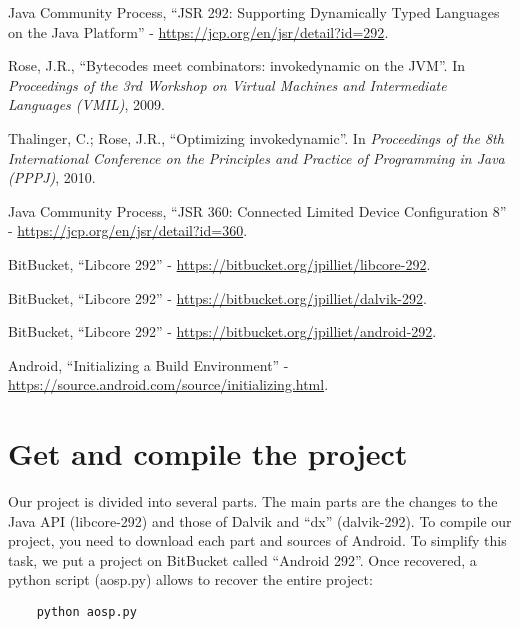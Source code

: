 \documentclass{sig-alternate}
\begin{document}
\begin{thebibliography}{}
  Java Community Process, ``JSR 292: Supporting Dynamically Typed Languages on the Java{\scriptsize\texttrademark} Platform'' - \url{https://jcp.org/en/jsr/detail?id=292}.

  Rose, J.R., ``Bytecodes meet combinators: invokedynamic on the JVM''. In {\it Proceedings of the 3rd Workshop on Virtual Machines and Intermediate Languages (VMIL)}, 2009.

  Thalinger, C.; Rose, J.R., ``Optimizing invokedynamic''. In {\it Proceedings of the 8th International Conference on the Principles and Practice of Programming in Java (PPPJ)}, 2010.

  Java Community Process, ``JSR 360: Connected Limited Device Configuration 8'' - \url{https://jcp.org/en/jsr/detail?id=360}.

  BitBucket, ``Libcore 292'' - \url{https://bitbucket.org/jpilliet/libcore-292}.

  BitBucket, ``Libcore 292'' - \url{https://bitbucket.org/jpilliet/dalvik-292}.

  BitBucket, ``Libcore 292'' - \url{https://bitbucket.org/jpilliet/android-292}.

  Android, ``Initializing a Build Environment'' - \url{https://source.android.com/source/initializing.html}.

\end{thebibliography}

\section{Get and compile the project}

  Our project is divided into several parts.
  The main parts are the changes to the Java API (libcore-292\cite{bb-libcore}) and those of Dalvik and ``dx'' (dalvik-292\cite{bb-dalvik}).
  To compile our project, you need to download each part and sources of Android.
  To simplify this task, we put a project on BitBucket called ``Android 292''\cite{bb-android}.
  Once recovered, a python script (aosp.py) allows to recover the entire project:

  {\scriptsize \begin{verbatim}
    python aosp.py
  \end{verbatim}}\vspace{-.8em}
\end{document}
